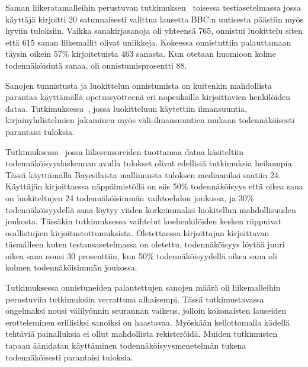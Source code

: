 \documentclass[finnish]{tktltiki2}
\theoremstyle{definition}
\theoremstyle{remark}
\begin{document}
Saman liikeratamalleihin perustuvan tutkimuksen~\cite{liu} toisessa testiasetelmassa jossa käyttäjä kirjoitti 20 satunnaisesti valittua lausetta BBC:n uutisesta päästiin myös hyviin tuloksiin. Vaikka sanakirjasanoja oli yhteensä 765, onnistui luokittelu siten että 615 sanan liikemallit olivat uniikkeja. Kokeessa onnistuttiin palauttamaan täysin oikein 57\% kirjoitetuista 463 sanasta. Kun otetaan huomioon kolme todennäköisintä sanaa, oli onnistumisprosentti 88.

Sanojen tunnistusta ja luokittelun onnistumista on kuitenkin mahdollista parantaa käyttämällä opetussyötteenä eri nopeuksilla kirjoittavien henkilöiden dataa. Tutkimuksessa~\cite{maiti}, jossa luokitteluun käytettiin ilmansuuntia, kirjainyhdistelmien jakaminen myös väli-ilmansuuntien mukaan todennäköisesti parantaisi tuloksia.

Tutkimuksessa~\cite{mole} jossa liikesensoreiden tuottamaa dataa käsiteltiin todennäköisyyslaskennan avulla tulokset olivat edellisiä tutkimuksia heikompia. Tässä käyttämällä Bayesilaista mallinnusta tuloksen mediaaniksi saatiin 24. Käyttäjän kirjoittaessa näppäimistöllä on siis 50\% todennäköisyys että oikea sana on luokiteltujen 24 todennäköisimmän vaihtoehdon joukossa, ja 30\% todennäköisyydellä sana löytyy viiden korkeimmaksi luokitellun mahdollisuuden joukosta. Tässäkin tutkimuksessa vaihtelut koehenkilöiden kesken riippuivat osallistujien kirjoitustottumuksista. Oletettaessa kirjoittajan kirjoittavan täsmälleen kuten testausasetelmassa on oletettu, todennäköisyys löytää juuri oikea sana nousi 30 prosenttiin, kun 50\% todennäköisyydellä oikea sana oli kolmen todennäköisimmän joukossa.

Tutkimuksessa onnistuneiden palautettujen sanojen määrä oli liikemalleihin perustuviin tutkimuksiin verrattuna alhaisempi. Tässä tutkimustavassa ongelmaksi nousi välilyönnin seurannan vaikeus, jolloin kokonaisten lauseiden erotteleminen erillisiksi sanoiksi on haastavaa. Myöskään kellottomalla kädellä tehtäviä painalluksia ei ollut mahdollista rekisteröidä. Muiden tutkimusten tapaan äänidatan käyttäminen todennäköisyysmenetelmän tukena todennäköisesti parantaisi tuloksia.
\end{document}

